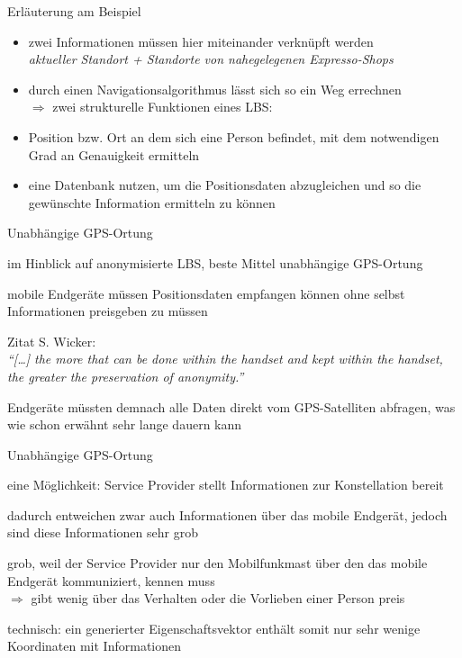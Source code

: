 \begin{frame}{Erläuterung am Beispiel}
\begin{itemize}
  \item zwei Informationen müssen hier miteinander verknüpft werden\\ \vspace{.1cm}
  \textit{aktueller Standort + Standorte von nahegelegenen Expresso-Shops}
  \item durch einen Navigationsalgorithmus lässt sich so ein Weg errechnen\\ \vspace{0.5cm}
  \hspace{-0.5cm}$\Longrightarrow$ zwei strukturelle Funktionen eines LBS:\\ \vspace{0.2cm}
  \enumerate
    \item Position bzw. Ort an dem sich eine Person befindet, mit dem notwendigen Grad an Genauigkeit ermitteln
    \item eine Datenbank nutzen, um die Positionsdaten abzugleichen und so die gewünschte Information ermitteln zu können
  \endenumerate  
\end{itemize}
\end{frame}

\begin{frame}{Unabhängige GPS-Ortung}
\itemize
  \item im Hinblick auf anonymisierte LBS, beste Mittel unabhängige GPS-Ortung
  \item mobile Endgeräte müssen Positionsdaten empfangen können ohne selbst Informationen preisgeben zu müssen
  \item Zitat S. Wicker:\\ \vspace{.2cm}
  \textit{"`[\dots] the more that can be done within the handset and kept within the handset, the greater the preservation of anonymity."'}\vspace{.2cm}
  \item Endgeräte müssten demnach alle Daten direkt vom GPS-Satelliten abfragen, was wie schon erwähnt sehr lange dauern kann
\enditemize
\end{frame}

\begin{frame}{Unabhängige GPS-Ortung}
\itemize
  \item eine Möglichkeit: Service Provider stellt Informationen zur Konstellation bereit
  \item dadurch entweichen zwar auch Informationen über das mobile Endgerät, jedoch sind diese Informationen sehr grob
  \item grob, weil der Service Provider nur den Mobilfunkmast über den das mobile Endgerät kommuniziert, kennen muss\\ \vspace{.1cm}
  $\Rightarrow$ gibt wenig über das Verhalten oder die Vorlieben einer Person preis  
  \item technisch: ein generierter  Eigenschaftsvektor enthält somit nur sehr wenige Koordinaten mit Informationen
\enditemize
\end{frame}

